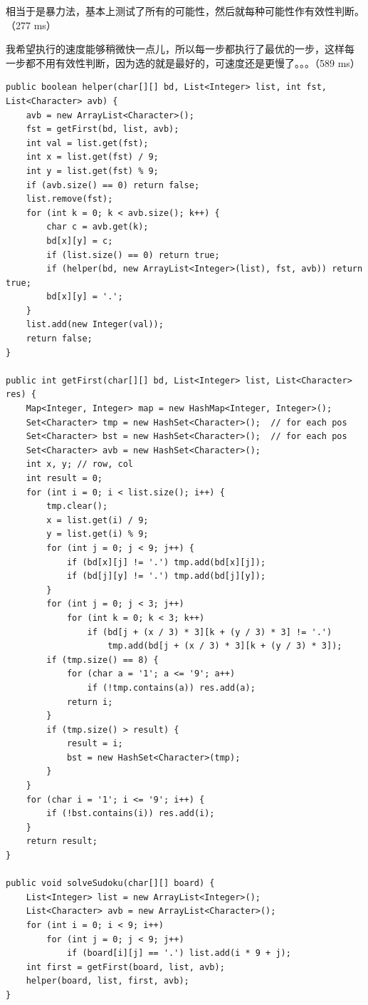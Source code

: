 \documentclass[12pt]{book}
\begin{document}
相当于是暴力法，基本上测试了所有的可能性，然后就每种可能性作有效性判断。（277 ms）

我希望执行的速度能够稍微快一点儿，所以每一步都执行了最优的一步，这样每
一步都不用有效性判断，因为选的就是最好的，可速度还是更慢了。。。（589
ms）

\lstset{language=java,label= ,caption= ,numbers=none}
\begin{lstlisting}
public boolean helper(char[][] bd, List<Integer> list, int fst, List<Character> avb) {
    avb = new ArrayList<Character>();
    fst = getFirst(bd, list, avb);
    int val = list.get(fst);
    int x = list.get(fst) / 9;
    int y = list.get(fst) % 9;
    if (avb.size() == 0) return false;
    list.remove(fst);
    for (int k = 0; k < avb.size(); k++) {
        char c = avb.get(k);
        bd[x][y] = c;
        if (list.size() == 0) return true;
        if (helper(bd, new ArrayList<Integer>(list), fst, avb)) return true;
        bd[x][y] = '.';
    }
    list.add(new Integer(val));
    return false;
}

public int getFirst(char[][] bd, List<Integer> list, List<Character> res) {
    Map<Integer, Integer> map = new HashMap<Integer, Integer>();
    Set<Character> tmp = new HashSet<Character>();  // for each pos
    Set<Character> bst = new HashSet<Character>();  // for each pos
    Set<Character> avb = new HashSet<Character>();
    int x, y; // row, col
    int result = 0;
    for (int i = 0; i < list.size(); i++) {
        tmp.clear();
        x = list.get(i) / 9;
        y = list.get(i) % 9;
        for (int j = 0; j < 9; j++) {
            if (bd[x][j] != '.') tmp.add(bd[x][j]);
            if (bd[j][y] != '.') tmp.add(bd[j][y]);
        }
        for (int j = 0; j < 3; j++) 
            for (int k = 0; k < 3; k++) 
                if (bd[j + (x / 3) * 3][k + (y / 3) * 3] != '.')
                    tmp.add(bd[j + (x / 3) * 3][k + (y / 3) * 3]);
        if (tmp.size() == 8) {
            for (char a = '1'; a <= '9'; a++)
                if (!tmp.contains(a)) res.add(a);
            return i;
        }
        if (tmp.size() > result) {
            result = i; 
            bst = new HashSet<Character>(tmp);
        }
    }
    for (char i = '1'; i <= '9'; i++) {
        if (!bst.contains(i)) res.add(i);
    }
    return result;
}
        
public void solveSudoku(char[][] board) {
    List<Integer> list = new ArrayList<Integer>();
    List<Character> avb = new ArrayList<Character>();
    for (int i = 0; i < 9; i++) 
        for (int j = 0; j < 9; j++) 
            if (board[i][j] == '.') list.add(i * 9 + j);
    int first = getFirst(board, list, avb);
    helper(board, list, first, avb);
}
\end{lstlisting}
\end{document}
